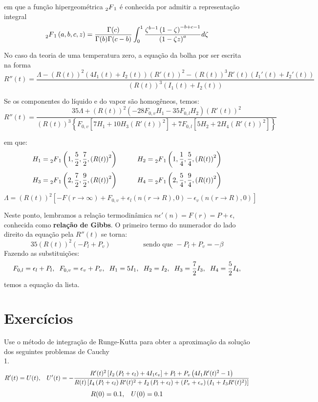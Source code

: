 \documentclass[10pt,a4paper]{article}
\newcommand{\prt}[1]{\left(#1\right)}
\newcommand{\col}[1]{\left[#1\right]}
\newcommand{\chv}[1]{\left\{#1\right\}}
\newcommand{\hgf}[4]{\prescript{}{2}{F}_1\left(#1,#2,#3,#4\right)}
\begin{document}
	em que a função hipergeométrica $\prescript{}{2}{F}_1$ é conhecida por admitir a representação integral
	\[\hgf{a}{b}{c}{z} = \frac{\Gamma(c)}{\Gamma(b)\Gamma(c-b)}\int_0^1{\frac{\zeta^{b-1}\prt{1-\zeta}^{-b+c-1}}{\prt{1-\zeta z}^a}d\zeta}\]
	
	No caso da teoria de uma temperatura zero, a equação da bolha por ser escrita na forma
	\[R''(t) = \frac{\Lambda-\prt{R(t)}^2\prt{4I_1(t)+I_2(t)}\prt{R'(t)}^2-\prt{R(t)}^3R'(t)\prt{I_1'(t)+I_2'(t)}}{\prt{R(t)}^3\prt{I_1(t)+I_2(t)}}\]
	
	Se os componentes do líquido e do vapor são homogêneos, temos:
	\[R''(t) = \frac{35\Lambda + \prt{R(t)}^2\prt{-28F_{0,v}H_1-35F_{0,l}H_2}\prt{R'(t)}^2}{\prt{R(t)}^3\chv{F_{0,v}\col{7H_1+10H_3\prt{R'(t)}^2}+7F_{0,l}\col{5H_2+2H_4\prt{R'(t)}^2}}}\]
	
	em que:
	\[H_1 = \hgf{1}{\frac{5}{2}}{\frac{7}{2}}{\prt{R(t)}^2} \hspace{1cm} H_2 = \hgf{1}{\frac{1}{4}}{\frac{5}{4}}{\prt{R(t)}^2}\]
	\[H_3 = \hgf{2}{\frac{7}{2}}{\frac{9}{2}}{\prt{R(t)}^2} \hspace{1cm} H_4 = \hgf{2}{\frac{5}{4}}{\frac{9}{4}}{\prt{R(t)}^2}\]
	\[\Lambda = \prt{R(t)}^2\col{-F(r\rightarrow\infty) + F_{0,v} + \epsilon_l(n(r\rightarrow R),0) - \epsilon_v(n(r\rightarrow R),0)}\]
	
	Neste ponto, lembramos a relação termodinâmica $n\epsilon'(n)=F(r)=P+\epsilon$, conhecida como \textbf{relação de Gibbs}. O primeiro termo do numerador do lado direito da equação pela $R''(t)$ se torna:
	\[35\prt{R(t)}^2\prt{-P_l+P_v}\hspace{2cm}\mbox{sendo que }-P_l+P_v=-\beta\]
	Fazendo as substituições:
	\[F_{0,l}=\epsilon_l+P_l, \hspace{.2cm} F_{0,v}=\epsilon_v+P_v, \hspace{.2cm} H_1=5I_1, \hspace{.2cm} H_2=I_2, \hspace{.2cm} H_3=\frac{7}{2}I_3,\hspace{.2cm}  H_4=\frac{5}{2}I_4,\]
	temos a equação da lista.
	
	\section{Exercícios}
	Use o método de integração de Runge-Kutta para obter a aproximação da solução dos seguintes problemas de Cauchy\\
	
	1. \[R'(t)=U(t), \hspace{0.3cm} U'(t)=-\frac{R'(t)^2\col{I_2\prt{P_l+\epsilon_l} + 4I_1\epsilon_v}+P_l+P_v\prt{4I_1R'(t)^2-1}}{R(t)\col{I_4\prt{P_l+\epsilon_l}R'(t)^2+I_2\prt{P_l+\epsilon_l}+\prt{P_v+\epsilon_v}\prt{I_1+I_3R'(t)^2}}}\]
	\[R(0)=0.1, \hspace{.3cm} U(0)=0.1\]
	
\end{document}
